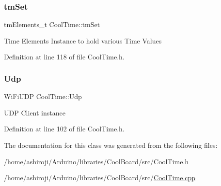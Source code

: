 \subsubsection{\texorpdfstring{tm\+Set}{tmSet}}
{\footnotesize\ttfamily tm\+Elements\+\_\+t Cool\+Time\+::tm\+Set\hspace{0.3cm}{\ttfamily [private]}}

Time Elements Instance to hold various Time Values 

Definition at line 118 of file Cool\+Time.\+h.

\mbox{\label{class_cool_time_a4e23216a8121ca79d0fb019f30884b92}} 
\subsubsection{\texorpdfstring{Udp}{Udp}}
{\footnotesize\ttfamily Wi\+Fi\+U\+DP Cool\+Time\+::\+Udp\hspace{0.3cm}{\ttfamily [private]}}

U\+DP Client instance 

Definition at line 102 of file Cool\+Time.\+h.



The documentation for this class was generated from the following files\+:\begin{DoxyCompactItemize}
\item 
/home/ashiroji/\+Arduino/libraries/\+Cool\+Board/src/\hyperlink{_cool_time_8h}{Cool\+Time.\+h}\item 
/home/ashiroji/\+Arduino/libraries/\+Cool\+Board/src/\hyperlink{_cool_time_8cpp}{Cool\+Time.\+cpp}\end{DoxyCompactItemize}
